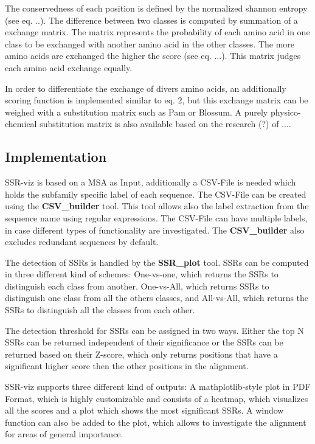 \documentclass{bioinfo}
\begin{document}
The conservedness of each position is defined by the normalized shannon entropy (see eq. ..).
The difference between two classes is computed by summation of a exchange matrix. The matrix
represents the probability of each amino acid in one class to be exchanged with another amino acid in 
the other classes. The more amino acids are exchanged the higher the score (see eq. ...).
This matrix judges each amino acid exchange equally.

In order to differentiate the exchange of divers amino acids,
an additionally scoring function is implemented similar to eq. 2, but 
this exchange matrix can be weighed with a substitution matrix such as
Pam or Blossum. A purely physico-chemical substitution matrix is also
available based on the research (?) of ....


\begin{methods}
\section{Implementation}

SSR-viz is based on a MSA as Input, additionally a CSV-File is needed which holds the 
subfamily specific label of each sequence. The CSV-File can be created using the
\textbf{CSV\_builder} tool. This tool allows also the label extraction from
the sequence name using regular expressions.
The CSV-File can have multiple labels, in case different types of functionality 
are investigated. The \textbf{CSV\_builder} also excludes redundant sequences by default.

The detection of SSRs is handled by the \textbf{SSR\_plot} tool. 
SSRs can be computed in three different kind of schemes: One-vs-one,
which returns the SSRs to distinguish each class from another.
One-vs-All, which returns SSRs to distinguish one class from all the others classes,
and All-vs-All, which returns the SSRs to distinguish all the classes from each other.

The detection threshold for SSRs can be assigned in two ways. Either the top N 
SSRs can be returned independent of their significance or the SSRs can be returned based
on their Z-score, which only returns positions that have a significant higher score then 
the other positions in the alignment.
 
SSR-viz supports three different kind of outputs:
A mathplotlib-style plot in PDF Format, which is highly customizable and consists
of a heatmap, which visualizes all the scores and a plot which shows the most 
significant SSRs. A window function can also be added to the plot, which allows 
to investigate the alignment for areas of general importance. 


\end{methods}
\end{document}
